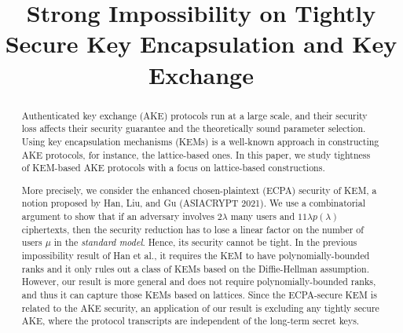 \documentclass{llncs}
\title{Strong Impossibility on Tightly Secure Key Encapsulation and Key Exchange}
\date{\now}
\begin{document}
\maketitle

\begin{abstract}
	Authenticated key exchange (AKE) protocols run at a large scale, and their security loss affects their security guarantee and the theoretically sound parameter selection. Using key encapsulation mechanisms (KEMs) is a well-known approach in constructing AKE protocols, for instance, the lattice-based ones. In this paper, we study tightness of KEM-based AKE protocols with a focus on lattice-based constructions.
	
	\quad More precisely, we consider the enhanced chosen-plaintext (ECPA) security of KEM, a notion proposed by Han, Liu, and Gu (ASIACRYPT 2021). We use a combinatorial argument to show that if an adversary involves $2 \lambda$ many users and $11 \lambda p(\lambda)$ ciphertexts, then the security reduction has to lose a linear factor on the number of users $\mu$ in the \emph{standard model}. Hence, its security cannot be tight. In the previous impossibility result of Han et al., it requires the KEM to have polynomially-bounded ranks and it only rules out a class of KEMs based on the Diffie-Hellman assumption. However, our result is more general and does not require polynomially-bounded ranks, and thus it can capture those KEMs based on lattices. Since the ECPA-secure KEM is related to the AKE security, an application of our result is excluding any tightly secure AKE, where the protocol transcripts are independent of the long-term secret keys.
\end{abstract}












\appendix




\end{document}
